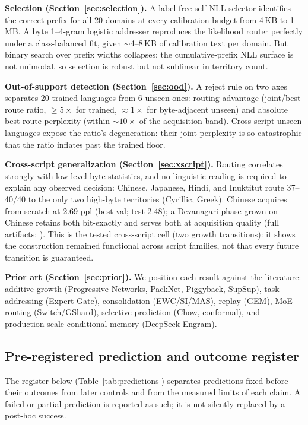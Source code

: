\documentclass[11pt]{article}
\theoremstyle{definition}\newtheorem{definition}{Definition}
\theoremstyle{remark}\newtheorem{remark}{Remark}
\begin{document}
\textbf{Selection (Section~\ref{sec:selection}).} A label-free self-NLL selector identifies the correct prefix for all 20 domains at every calibration budget from 4\,KB to 1\,MB. A byte 1--4-gram logistic addresser reproduces the likelihood router perfectly under a class-balanced fit, given $\sim$4--8\,KB of calibration text per domain. But binary search over prefix widths collapses: the cumulative-prefix NLL surface is not unimodal, so selection is robust but not sublinear in territory count.

\textbf{Out-of-support detection (Section~\ref{sec:ood}).} A reject rule on two axes separates 20 trained languages from 6 unseen ones: routing advantage (joint/best-route ratio, $\ge 5\times$ for trained, $\approx 1\times$ for byte-adjacent unseen) and absolute best-route perplexity (within $\sim 10\times$ of the acquisition band). Cross-script unseen languages expose the ratio's degeneration: their joint perplexity is so catastrophic that the ratio inflates past the trained floor.

\textbf{Cross-script generalization (Section~\ref{sec:xscript}).} Routing correlates strongly with low-level byte statistics, and no linguistic reading is required to explain any observed decision: Chinese, Japanese, Hindi, and Inuktitut route 37--40/40 to the only two high-byte territories (Cyrillic, Greek). Chinese acquires from scratch at 2.69 ppl (best-val; test 2.48); a Devanagari phase grown on Chinese retains both bit-exactly and serves both at acquisition quality (full artifacts: ). This is the tested cross-script cell (two growth transitions): it shows the construction remained functional across script families, not that every future transition is guaranteed.

\textbf{Prior art (Section~\ref{sec:prior}).} We position each result against the literature: additive growth (Progressive Networks, PackNet, Piggyback, SupSup), task addressing (Expert Gate), consolidation (EWC/SI/MAS), replay (GEM), MoE routing (Switch/GShard), selective prediction (Chow, conformal), and production-scale conditional memory (DeepSeek Engram).

\subsection{Pre-registered prediction and outcome register}\label{sec:predictions}

The register below (Table~\ref{tab:predictions}) separates predictions fixed before their outcomes from later controls and from the measured limits of each claim. A failed or partial prediction is reported as such; it is not silently replaced by a post-hoc success.
\end{document}
